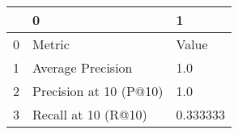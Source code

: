 \begin{tabular}{lll}
\toprule
{} &                       0 &         1 \\
\midrule
0 &                  Metric &     Value \\
1 &       Average Precision &       1.0 \\
2 &  Precision at 10 (P@10) &       1.0 \\
3 &     Recall at 10 (R@10) &  0.333333 \\
\bottomrule
\end{tabular}
